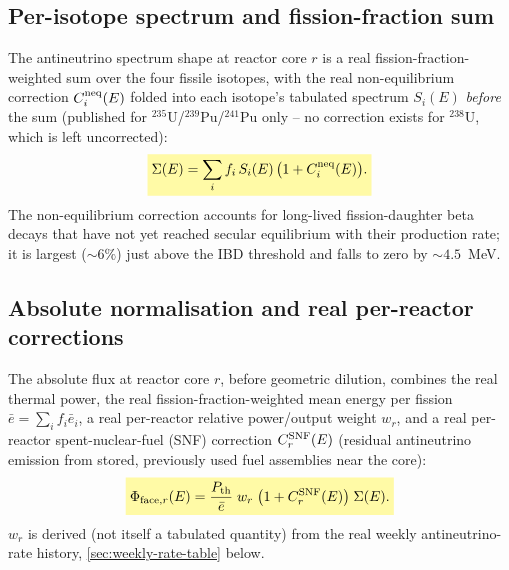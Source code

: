 \begin{theorybox}
\subsection*{Per-isotope spectrum and fission-fraction sum}
The antineutrino spectrum shape at reactor core $r$ is a real
fission-fraction-weighted sum over the four fissile isotopes, with the real
non-equilibrium correction $C_i^{\rm neq}(E)$ folded into each isotope's
tabulated spectrum $S_i(E)$ \emph{before} the sum (published for
$^{235}$U/$^{239}$Pu/$^{241}$Pu only -- no correction exists for
$^{238}$U, which is left uncorrected):
\begin{equation}
  \keyresult{\Sigma(E) = \sum_{i} f_i\, S_i(E)\,\bigl(1+C_i^{\rm neq}(E)\bigr).}
  \label{eq:dayabay-spectrum-shape}
\end{equation}
The non-equilibrium correction accounts for long-lived fission-daughter
beta decays that have not yet reached secular equilibrium with their
production rate; it is largest ($\sim6\%$) just above the IBD threshold and
falls to zero by $\sim4.5$~MeV.

\subsection*{Absolute normalisation and real per-reactor corrections}
The absolute flux at reactor core $r$, before geometric dilution, combines
the real thermal power, the real fission-fraction-weighted mean energy per
fission $\bar e = \sum_i f_i \bar e_i$, a real per-reactor relative
power/output weight $w_r$, and a real per-reactor spent-nuclear-fuel (SNF)
correction $C_r^{\rm SNF}(E)$ (residual antineutrino emission from stored,
previously used fuel assemblies near the core):
\begin{equation}
  \keyresult{\Phi_{{\rm face},r}(E) = \frac{P_{\rm th}}{\bar e}\;
    w_r\;\bigl(1+C_r^{\rm SNF}(E)\bigr)\;\Sigma(E).}
  \label{eq:dayabay-face-flux}
\end{equation}
$w_r$ is derived (not itself a tabulated quantity) from the real weekly
antineutrino-rate history, \cref{sec:weekly-rate-table} below.


\end{theorybox}
